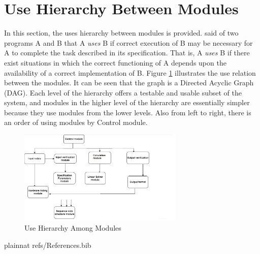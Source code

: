 \documentclass[12pt, titlepage]{article}
\begin{document}
\section{Use Hierarchy Between Modules} \label{SecUse}

In this section, the uses hierarchy between modules is
provided. \citet{Parnas1978} said of two programs A and B that A {\em uses} B if
correct execution of B may be necessary for A to complete the task described in
its specification. That is, A {\em uses} B if there exist situations in which
the correct functioning of A depends upon the availability of a correct
implementation of B.  Figure \ref{FigUH} illustrates the use relation between
the modules. It can be seen that the graph is a Directed Acyclic Graph
(DAG). Each level of the hierarchy offers a testable and usable subset of the
system, and modules in the higher level of the hierarchy are essentially simpler
because they use modules from the lower levels. Also from left to right, there is an order of using modules by Control module.

\begin{figure}[H]
\centering
\includegraphics[width=0.7\textwidth]{mg.png}
\caption{Use Hierarchy Among Modules}
\label{FigUH}
\end{figure}


 {plainnat}
 {refs/References.bib}

\newpage{}
\end{document}
